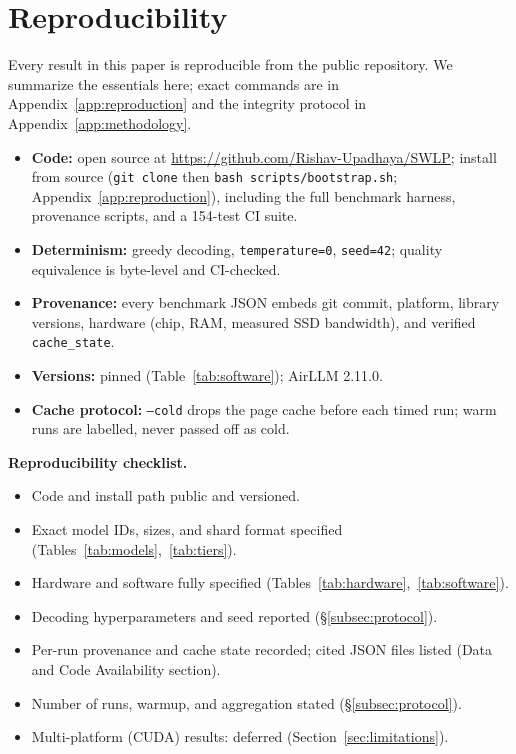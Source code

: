 \documentclass[10pt,a4paper]{article}
\begin{document}
\section{Reproducibility}
\label{sec:repro}

Every result in this paper is reproducible from the public repository. We
summarize the essentials here; exact commands are in
Appendix~\ref{app:reproduction} and the integrity protocol in
Appendix~\ref{app:methodology}.

\begin{itemize}[leftmargin=2em]
  \item \textbf{Code:} open source at
    \url{https://github.com/Rishav-Upadhaya/SWLP}; install from source
    (\texttt{git clone} then \texttt{bash scripts/bootstrap.sh};
    Appendix~\ref{app:reproduction}), including the full benchmark harness,
    provenance scripts, and a 154-test CI suite.
  \item \textbf{Determinism:} greedy decoding, \texttt{temperature=0},
    \texttt{seed=42}; quality equivalence is byte-level and CI-checked.
  \item \textbf{Provenance:} every benchmark JSON embeds git commit, platform,
    library versions, hardware (chip, RAM, measured SSD bandwidth), and verified
    \texttt{cache\_state}.
  \item \textbf{Versions:} pinned (Table~\ref{tab:software}); AirLLM 2.11.0.
  \item \textbf{Cache protocol:} \texttt{--cold} drops the page cache before each
    timed run; warm runs are labelled, never passed off as cold.
\end{itemize}

\noindent\textbf{Reproducibility checklist.}
\begin{itemize}[leftmargin=2em,nosep]
  \item[$\boxtimes$] Code and install path public and versioned.
  \item[$\boxtimes$] Exact model IDs, sizes, and shard format specified
    (Tables~\ref{tab:models},~\ref{tab:tiers}).
  \item[$\boxtimes$] Hardware and software fully specified
    (Tables~\ref{tab:hardware},~\ref{tab:software}).
  \item[$\boxtimes$] Decoding hyperparameters and seed reported
    (\S\ref{subsec:protocol}).
  \item[$\boxtimes$] Per-run provenance and cache state recorded; cited JSON files
    listed (Data and Code Availability section).
  \item[$\boxtimes$] Number of runs, warmup, and aggregation stated
    (\S\ref{subsec:protocol}).
  \item[$\square$] Multi-platform (CUDA) results: deferred
    (Section~\ref{sec:limitations}).
\end{itemize}
\end{document}
